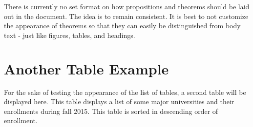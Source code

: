 There is currently no set format on how propositions and theorems should be laid out in the document. The idea is to remain consistent. It is best to not customize the appearance of theorems so that they can easily be distinguished from body text - just like figures, tables, and headings.

\section{Another Table Example}
For the sake of testing the appearance of the list of tables, a second table will be displayed here. This table displays a list of some major universities and their enrollments during fall 2015. This table is sorted in descending order of enrollment.
